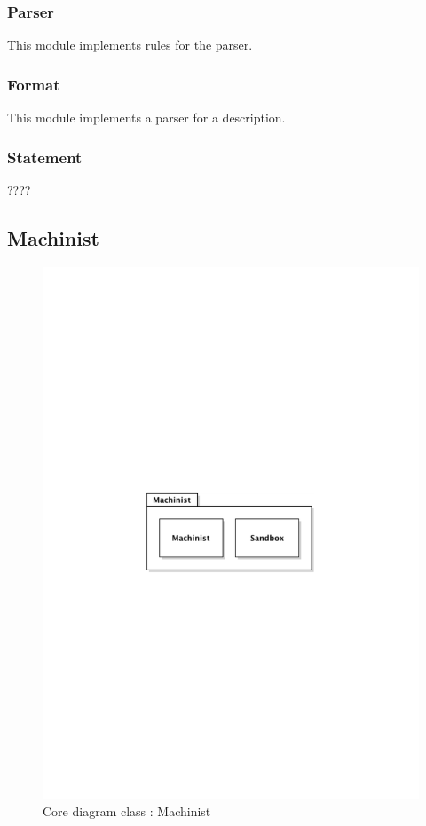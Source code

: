 		\subsubsection{Parser}
			This module implements rules for the parser.
		\subsubsection{Format}
			This module implements a parser for a description.
		\subsubsection{Statement}
			???? 
\newpage
	\subsection{Machinist}
		\begin{figure}[ht]
			\begin{center}
				\includegraphics[width=\textwidth,  trim=2cm 12cm 2cm 12cm]{UML_figure/DC/core/machinist/DC_Machinist.pdf}
				\caption{Core diagram class : Machinist}
			\end{center}
		\end{figure}
